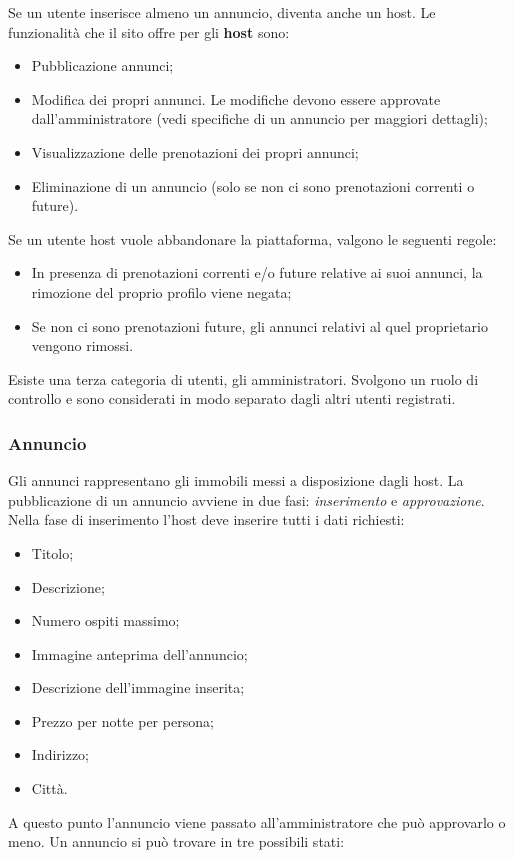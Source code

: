 \documentclass[1_relazione.tex]{subfiles}
\begin{document}
Se un utente inserisce almeno un annuncio, diventa anche un host. Le funzionalità che il sito offre per gli \textbf{host} sono: 
\begin{itemize}
\item Pubblicazione annunci;
\item Modifica dei propri annunci. Le modifiche devono essere approvate dall'amministratore (vedi specifiche di un annuncio per maggiori dettagli);
\item Visualizzazione delle prenotazioni dei propri annunci;
\item Eliminazione di un annuncio (solo se non ci sono prenotazioni correnti o future).
\end{itemize}
Se un utente host vuole abbandonare la piattaforma, valgono le seguenti regole:
\begin{itemize}
\item In presenza di prenotazioni correnti e/o future relative ai suoi annunci, la rimozione del proprio profilo viene negata;
\item Se non ci sono prenotazioni future, gli annunci relativi al quel proprietario vengono rimossi.
\end{itemize}
Esiste una terza categoria di utenti, gli amministratori. Svolgono un ruolo di controllo e sono considerati in modo separato dagli altri utenti registrati.  \\
\subsubsection{Annuncio} 
Gli annunci rappresentano gli immobili messi a disposizione dagli host. La pubblicazione di un annuncio avviene in due fasi: \textit{inserimento} e \textit{approvazione}.
Nella fase di inserimento l'host deve inserire tutti i dati richiesti:
\begin{itemize}
 \item Titolo;
 \item Descrizione;
 \item Numero ospiti massimo;
 \item Immagine anteprima dell'annuncio;
 \item Descrizione dell'immagine inserita;
 \item Prezzo per notte per persona;
 \item Indirizzo;
 \item Città.
\end{itemize}
A questo punto l'annuncio viene passato all'amministratore che può approvarlo o meno. Un annuncio si può trovare in tre possibili stati:
\end{document}
